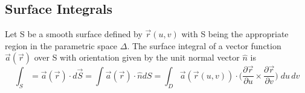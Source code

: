 \documentclass[a4paper, 11pt, normalem]{report}
\newcommand\p{\partial}
\newcommand\veca{\vec{a}(\vec{r})}
\begin{document}
\chapter{}
\section{Surface Integrals}
Let S be a smooth surface defined by $\vec{r}(u, v)$ with S being the appropriate region in the parametric space $\Delta$.
The surface integral of a vector function $\veca$ over S with orientation given by the unit normal vector $\hat{n}$ is
\begin{equation*}
    \int_S = \veca \cdot d\vec{S} = \int \veca \cdot \hat{n}dS = \int_D \vec{a}(\vec{r}(u, v)) \cdot \Big(\frac{\p \vec{r}}{\p u} \times \frac{\p \vec{r}}{\p v}\Big)\;du\,dv
\end{equation*}
\end{document}
